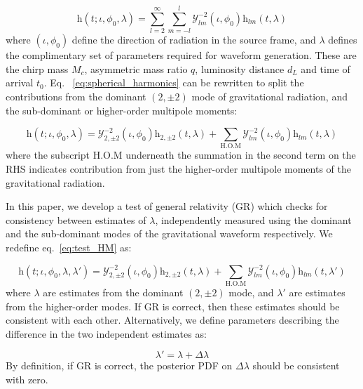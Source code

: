 \documentclass[prd,preprintnumbers,twocolumn,eqsecnum,floatfix,a4paper,nofootinbib,superscriptaddress]{revtex4}
\begin{document}
\begin{equation}
\mathrm{h}(t; \iota, \phi_0, \lambda) = \sum _{l=2}^{\infty} \sum _{m=-l}^{l} \mathcal{Y}_{lm}^{-2} (\iota, \phi_0)\mathrm{h}_{lm}(t, \lambda)
\label{eq:spherical_harmonics}
\end{equation}
where $(\iota, \phi_0)$ define the direction of radiation in the source frame, and $\lambda$ defines the complimentary set of parameters required for waveform generation. These are the chirp mass $M_c$, asymmetric mass ratio $q$, luminosity distance $d_L$ and time of arrival $t_0$. Eq. ~\ref{eq:spherical_harmonics} can be rewritten to split the contributions from the dominant $(2,\pm 2)$ mode of gravitational radiation, and the sub-dominant or higher-order multipole moments:

\begin{equation}
\mathrm{h}(t; \iota, \phi_0, \lambda) = \mathcal{Y}_{2,\pm 2}^{-2} (\iota, \phi_0)\mathrm{h}_{2,\pm 2}(t, \lambda) + \sum _{\text{H.O.M}} \mathcal{Y}_{lm}^{-2} (\iota, \phi_0)\mathrm{h}_{lm}(t, \lambda)
\label{eq:test_HM}
\end{equation}
where the subscript H.O.M underneath the summation in the second term on the RHS indicates contribution from just the higher-order multipole moments of the gravitational radiation.

In this paper, we develop a test of general relativity (GR) which checks for consistency between estimates of $\lambda$, independently measured using the dominant and the sub-dominant modes of the gravitational waveform respectively. We redefine eq.~\ref{eq:test_HM} as:

\begin{equation}
\mathrm{h}(t; \iota, \phi_0, \lambda, \lambda') = \mathcal{Y}_{2,\pm 2}^{-2} (\iota, \phi_0)\mathrm{h}_{2,\pm 2}(t, \lambda) + \sum _{\text{H.O.M}} \mathcal{Y}_{lm}^{-2} (\iota, \phi_0)\mathrm{h}_{lm}(t, \lambda')
\end{equation}
where $\lambda$ are estimates from the dominant $(2,\pm 2)$ mode, and $\lambda'$ are estimates from the higher-order modes. If GR is correct, then these estimates should be consistent with each other. Alternatively, we define parameters describing the difference in the two independent estimates as:

\begin{equation}
\lambda ' = \lambda + \Delta \lambda
\end{equation}
By definition, if GR is correct, the posterior PDF on $\Delta \lambda$ should be consistent with zero.
\end{document}
